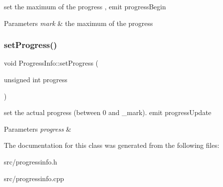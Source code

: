 set the maximum of the progress , emit progress\+Begin 


\begin{DoxyParams}{Parameters}
{\em mark} & the maximum of the progress \\
\hline
\end{DoxyParams}
\mbox{\label{class_progress_info_acbc2662a15cb1212bdbb223544f8b3d4}} 
\subsubsection{\texorpdfstring{set\+Progress()}{setProgress()}}
{\footnotesize\ttfamily void Progress\+Info\+::set\+Progress (\begin{DoxyParamCaption}\item[{unsigned int}]{progress }\end{DoxyParamCaption})}



set the actual progress (between 0 and \+\_\+mark). emit progress\+Update 


\begin{DoxyParams}{Parameters}
{\em progress} & \\
\hline
\end{DoxyParams}


The documentation for this class was generated from the following files\+:\begin{DoxyCompactItemize}
\item 
src/progressinfo.\+h\item 
src/progressinfo.\+cpp\end{DoxyCompactItemize}
